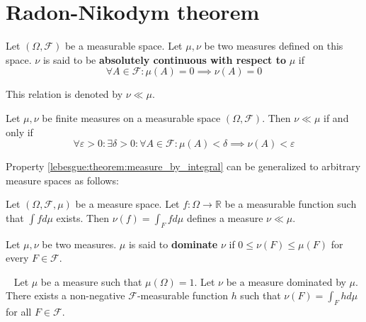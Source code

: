 \section{Radon-Nikodym theorem}
\label{lebesgue:section:Radon-Nikodym}
	
    \begin{definition}
		Let $(\Omega,\mathcal{F})$ be a measurable space. Let $\mu, \nu$ be two measures defined on this space. $\nu$ is said to be \textbf{absolutely continuous with respect to} $\mu$ if
        \begin{equation}
        	\label{lebesgue:absolute_continuity}
        	\forall A\in\mathcal{F}: \mu(A) = 0\implies\nu(A) = 0
		\end{equation}
	\end{definition}
    \begin{notation}
		This relation is denoted by $\nu \ll \mu$.
	\end{notation}
    \begin{theorem}
    	Let $\mu, \nu$ be finite measures on a measurable space $(\Omega, \mathcal{F})$. Then $\nu\ll\mu$ if and only if
        \begin{equation}
        	\forall\varepsilon>0:\exists\delta>0:\forall A\in\mathcal{F}:\mu(A)<\delta\implies\nu(A)<\varepsilon
        \end{equation}
	\end{theorem}
    
    Property \ref{lebesgue:theorem:measure_by_integral} can be generalized to arbitrary measure spaces as follows:
    \begin{property}
		Let $(\Omega,\mathcal{F}, \mu)$ be a measure space. Let $f:\Omega\rightarrow\mathbb{R}$ be a measurable function such that $\int fd\mu$ exists. Then $\nu(f) = \int_Ffd\mu$ defines a measure $\nu\ll\mu$.
	\end{property}
    
    \begin{definition}
    	Let $\mu, \nu$ be two measures. $\mu$ is said to \textbf{dominate} $\nu$ if $0\leq\nu(F)\leq\mu(F)$ for every $F\in\mathcal{F}$.
    \end{definition}
    
    \begin{theorem}~\newline
		Let $\mu$ be a measure such that $\mu(\Omega) = 1$. Let $\nu$ be a measure dominated by $\mu$. There exists a non-negative $\mathcal{F}$-measurable function $h$ such that $\nu(F) = \int_F hd\mu$ for all $F\in\mathcal{F}$.
	\end{theorem}
    
